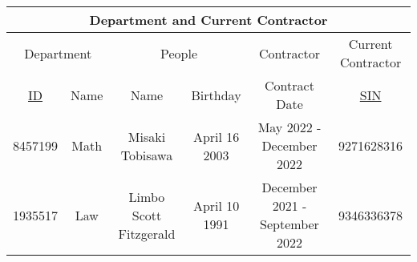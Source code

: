 \documentclass[12pt]{article}
\begin{document}
\begin{center}
    \begin{tabular}{|c|c||c|c||c||c|}
        \hline
        \multicolumn{6}{|c|}{\cellcolor{gray!25}Department and Current Contractor}                                                                       \\
        \hline
        \hline
        \multicolumn{2}{|c||}{\cellcolor{gray!25}Department}
                & \multicolumn{2}{c||}{\cellcolor{gray!25}People}
                & {\cellcolor{gray!25}Contractor}
                & {\cellcolor{gray!25}Current Contractor}                                                                                                \\
        \hline
        \cellcolor{gray!25} \underline{ID}
                & \cellcolor{gray!25}Name
                & \cellcolor{gray!25}Name
                & \cellcolor{gray!25}Birthday
                & \cellcolor{gray!25}Contract Date
                & \cellcolor{gray!25}\underline{SIN}                                                                                                     \\
        \hline \hline
        8457199 & Math                                            & Misaki Tobisawa        & April 16 2003 & May 2022 - December 2022       & 9271628316 \\ \hline
        1935517 & Law                                             & Limbo Scott Fitzgerald & April 10 1991 & December 2021 - September 2022 & 9346336378 \\ \hline
    \end{tabular}
\end{center}
\end{document}
